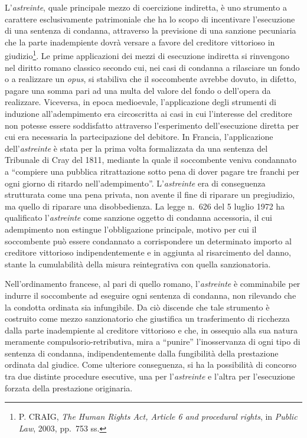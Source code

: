 \documentclass[12pt,it,a4paper,]{report}
\begin{document}
L'\emph{astreinte}, quale principale mezzo di coercizione indiretta, è
uno strumento a carattere esclusivamente patrimoniale che ha lo scopo di
incentivare l'esecuzione di una sentenza di condanna, attraverso la
previsione di una sanzione pecuniaria che la parte inadempiente dovrà
versare a favore del creditore vittorioso in giudizio\footnote{P. CRAIG,
  \emph{The Human Rights Act, Article 6 and procedural rights}, in
  \emph{Public Law}, 2003, pp.~753 ss.}. Le prime applicazioni dei mezzi
di esecuzione indiretta si rinvengono nel diritto romano classico
secondo cui, nei casi di condanna a rilasciare un fondo o a realizzare
un \emph{opus}, si stabiliva che il soccombente avrebbe dovuto, in
difetto, pagare una somma pari ad una multa del valore del fondo o
dell'opera da realizzare. Viceversa, in epoca medioevale, l'applicazione
degli strumenti di induzione all'adempimento era circoscritta ai casi in
cui l'interesse del creditore non potesse essere soddisfatto attraverso
l'esperimento dell'esecuzione diretta per cui era necessaria la
partecipazione del debitore. In Francia, l'applicazione
dell'\emph{astreinte} è stata per la prima volta formalizzata da una
sentenza del Tribunale di Cray del 1811, mediante la quale il
soccombente veniva condannato a ``compiere una pubblica ritrattazione
sotto pena di dover pagare tre franchi per ogni giorno di ritardo
nell'adempimento''. L'\emph{astreinte} era di conseguenza strutturata
come una pena privata, non avente il fine di riparare un pregiudizio, ma
quello di riparare una disobbedienza. La legge n.~626 del 5 luglio 1972
ha qualificato l'\emph{astreinte} come sanzione oggetto di condanna
accessoria, il cui adempimento non estingue l'obbligazione principale,
motivo per cui il soccombente può essere condannato a corrispondere un
determinato importo al creditore vittorioso indipendentemente e in
aggiunta al risarcimento del danno, stante la cumulabilità della misura
reintegrativa con quella sanzionatoria.

Nell'ordinamento francese, al pari di quello romano, l'\emph{astreinte}
è comminabile per indurre il soccombente ad eseguire ogni sentenza di
condanna, non rilevando che la condotta ordinata sia infungibile. Da ciò
discende che tale strumento è costruito come mezzo sanzionatorio che
giustifica un trasferimento di ricchezza dalla parte inadempiente al
creditore vittorioso e che, in ossequio alla sua natura meramente
compulsorio-retributiva, mira a ``punire'' l'inosservanza di ogni tipo
di sentenza di condanna, indipendentemente dalla fungibilità della
prestazione ordinata dal giudice. Come ulteriore conseguenza, si ha la
possibilità di concorso tra due distinte procedure esecutive, una per
l'\emph{astreinte} e l'altra per l'esecuzione forzata della prestazione
originaria.
\end{document}
